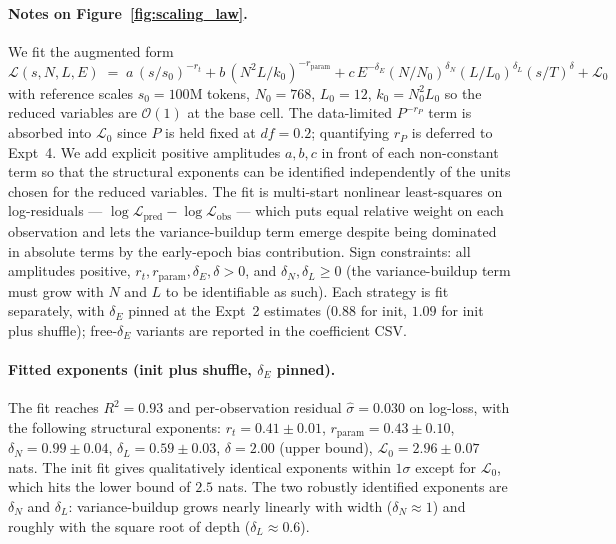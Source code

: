 \paragraph{Notes on Figure~\ref{fig:scaling_law}.}
We fit the augmented form
$$\mathcal{L}(s, N, L, E) \;=\; a\,(s/s_0)^{-r_t} + b\,(N^2 L / k_0)^{-r_{\mathrm{param}}} + c\, E^{-\delta_E} (N/N_0)^{\delta_N} (L/L_0)^{\delta_L} (s/T)^{\delta} + \mathcal{L}_0$$
with reference scales $s_0 = 100$M tokens, $N_0 = 768$, $L_0 = 12$, $k_0 = N_0^2 L_0$ so the reduced variables are $\mathcal{O}(1)$ at the base cell.
The data-limited $P^{-r_P}$ term is absorbed into $\mathcal{L}_0$ since $P$ is held fixed at $df = 0.2$; quantifying $r_P$ is deferred to Expt~4.
We add explicit positive amplitudes $a, b, c$ in front of each non-constant term so that the structural exponents can be identified independently of the units chosen for the reduced variables.
The fit is multi-start nonlinear least-squares on log-residuals --- $\log \mathcal{L}_{\mathrm{pred}} - \log \mathcal{L}_{\mathrm{obs}}$ --- which puts equal relative weight on each observation and lets the variance-buildup term emerge despite being dominated in absolute terms by the early-epoch bias contribution.
Sign constraints: all amplitudes positive, $r_t, r_{\mathrm{param}}, \delta_E, \delta > 0$, and $\delta_N, \delta_L \geq 0$ (the variance-buildup term must grow with $N$ and $L$ to be identifiable as such).
Each strategy is fit separately, with $\delta_E$ pinned at the Expt~2 estimates ($0.88$ for init, $1.09$ for init plus shuffle); free-$\delta_E$ variants are reported in the coefficient CSV.

\paragraph{Fitted exponents (init plus shuffle, $\delta_E$ pinned).}
The fit reaches $R^2 = 0.93$ and per-observation residual $\hat\sigma = 0.030$ on log-loss, with the following structural exponents:
$r_t = 0.41 \pm 0.01$, $r_{\mathrm{param}} = 0.43 \pm 0.10$, $\delta_N = 0.99 \pm 0.04$, $\delta_L = 0.59 \pm 0.03$, $\delta = 2.00$ (upper bound), $\mathcal{L}_0 = 2.96 \pm 0.07$ nats.
The init fit gives qualitatively identical exponents within $1\sigma$ except for $\mathcal{L}_0$, which hits the lower bound of $2.5$ nats.
The two robustly identified exponents are $\delta_N$ and $\delta_L$: variance-buildup grows nearly linearly with width ($\delta_N \approx 1$) and roughly with the square root of depth ($\delta_L \approx 0.6$).

